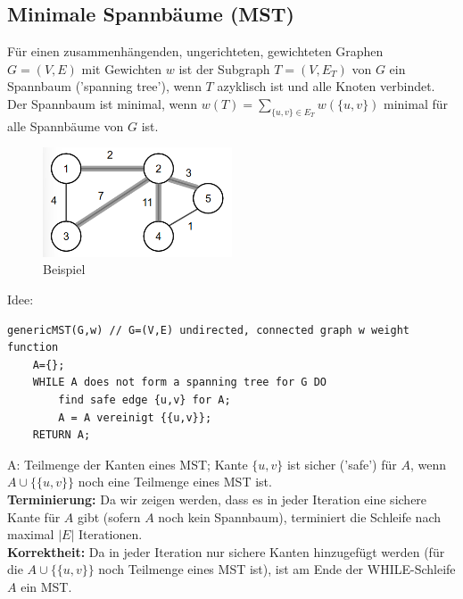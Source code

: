 \documentclass{article}
\begin{document}
        \subsection{Minimale Spannbäume (MST)}
            Für einen zusammenhängenden, ungerichteten, gewichteten Graphen $G=(V,E)$ mit Gewichten $w$ ist der Subgraph $T=(V,E_T)$ von $G$ ein Spannbaum ('spanning tree'), wenn $T$ azyklisch ist und alle Knoten verbindet. \\
            Der Spannbaum ist minimal, wenn $w(T)=\sum_{\{u,v\}\in E_T}w(\{u,v\})$ minimal für alle Spannbäume von $G$ ist.\\
            \begin{figure}[ht]
                \centering
                \includegraphics[width=0.5\textwidth]{Bilder/MSTBsp.png}
                \caption{Beispiel}
                \label{fig:MSTBsp}
            \end{figure}
            Idee:\\
            \begin{lstlisting}[style=pseudocode]
genericMST(G,w) // G=(V,E) undirected, connected graph w weight function
    A={};
    WHILE A does not form a spanning tree for G DO
        find safe edge {u,v} for A;
        A = A vereinigt {{u,v}};
    RETURN A;
            \end{lstlisting}
            A: Teilmenge der Kanten eines MST; Kante $\{u,v\}$ ist sicher ('safe') für $A$, wenn $A \cup \{\{u,v\}\}$ noch eine Teilmenge eines MST ist.\\
            \textbf{Terminierung:} Da wir zeigen werden, dass es in jeder Iteration eine sichere Kante für $A$ gibt (sofern $A$ noch kein Spannbaum), terminiert die Schleife nach maximal $|E|$ Iterationen.\\
            \textbf{Korrektheit:} Da in jeder Iteration nur sichere Kanten hinzugefügt werden (für die $A \cup \{\{u,v\}\}$ noch Teilmenge eines MST ist), ist am Ende der WHILE-Schleife $A$ ein MST.\\
\end{document}
